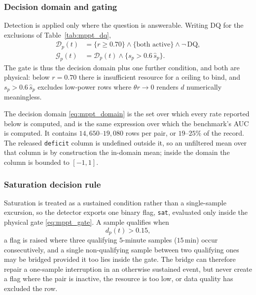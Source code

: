 \subsubsection{Decision domain and gating}
\label{sss:mppt_domain}

Detection is applied only where the question is answerable. Writing $\mathrm{DQ}$ for the exclusions of Table~\ref{tab:mppt_dq},
%
\begin{align}
  \mathcal{D}_p(t) &= \{r \ge 0.70\} \wedge \{\text{both active}\}
\wedge \neg\,\mathrm{DQ},
  \label{eq:mppt_domain}\\[2pt]
  \mathcal{G}_p(t) &= \mathcal{D}_p(t) \wedge
\{s_p > 0.6\,\widehat{s}_p\}.
  \label{eq:mppt_gate}
\end{align}
%
The gate is thus the decision domain plus one further condition, and both are physical: below $r = 0.70$ there is insufficient resource for a ceiling to bind, and $s_p > 0.6\,\widehat{s}_p$ excludes low-power rows where $\theta r \rightarrow 0$ renders $d$ numerically meaningless.

The decision domain \eqref{eq:mppt_domain} is the set over which every rate reported below is computed, and is the same expression over which the benchmark's AUC is computed. It contains $14{,}650$--$19{,}080$ rows per pair, or $19$--$25\%$ of the record. The released \texttt{deficit} column is undefined outside it, so an unfiltered mean over that column is by construction the in-domain mean; inside the domain the column is bounded to $[-1,1]$.

\subsubsection{Saturation decision rule}
\label{sss:mppt_rule}

Saturation is treated as a sustained condition rather than a single-sample excursion, so the detector exports one binary flag, \texttt{sat}, evaluated only inside the physical gate \eqref{eq:mppt_gate}. A sample qualifies when
%
\begin{equation}
  d_p(t) > 0.15 ,
  \label{eq:mppt_flag_threshold}
\end{equation}
%
a flag is raised where three qualifying $5$-minute samples ($15$\,min) occur consecutively, and a single non-qualifying sample between two qualifying ones may be bridged provided it too lies inside the gate. The bridge can therefore repair a one-sample interruption in an otherwise sustained event, but never create a flag where the pair is inactive, the resource is too low, or data quality has excluded the row.

